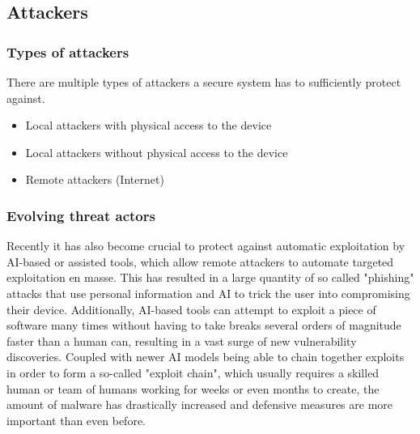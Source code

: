\documentclass[a4paper,12pt]{report}
\begin{document}
\subsection{Attackers}
\subsubsection{Types of attackers}
There are multiple types of attackers a secure system has to sufficiently protect against.
\begin{itemize}
    \item Local attackers with physical access to the device
    \item Local attackers without physical access to the device
    \item Remote attackers (Internet)
\end{itemize}
\subsubsection{Evolving threat actors}
Recently it has also become crucial to protect against automatic exploitation by AI-based or assisted tools, which allow remote attackers to automate targeted exploitation en masse. This has resulted in a large quantity of so called "phishing" attacks that use personal information and AI to trick the user into compromising their device. Additionally, AI-based tools can attempt to exploit a piece of software many times without having to take breaks several orders of magnitude faster than a human can, resulting in a vast surge of new vulnerability discoveries. Coupled with newer AI models being able to chain together exploits in order to form a so-called "exploit chain", which usually requires a skilled human or team of humans working for weeks or even months to create, the amount of malware has drastically increased and defensive measures are more important than even before. 
\end{document}
